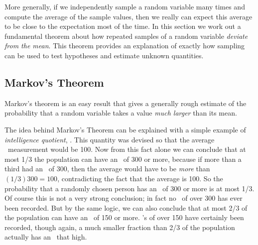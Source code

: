 More generally, if we independently sample a random variable many times
and compute the average of the sample values, then we really can expect
this average to be close to the expectation most of the time.  In this
section we work out a fundamental theorem about how repeated samples of a
random variable \emph{deviate from the mean}.  This theorem provides an
explanation of exactly how sampling can be used to test hypotheses and
estimate unknown quantities.

\subsection{Markov's Theorem}
Markov's theorem is an easy result that gives a generally rough estimate
of the probability that a random variable takes a value \emph{much larger}
than its mean.

The idea behind Markov's Theorem can be explained with a simple example of
\emph{intelligence quotient}, \IQ.  This quantity was devised so that the
average \IQ\ measurement would be 100.  Now from this fact alone we can
conclude that at most 1/3 the population can have an \IQ\ of 300 or more,
because if more than a third had an \IQ\ of 300, then the average would
have to be \emph{more} than $(1/3)300 = 100$, contradicting the fact that
the average is 100.  So the probability that a randomly chosen person has
an \IQ\ of 300 or more is at most 1/3.  Of course this is not a very
strong conclusion; in fact no \IQ\ of over 300 has ever been recorded.
But by the same logic, we can also conclude that at most 2/3 of the
population can have an \IQ\ of 150 or more.  \IQ's of over 150 have
certainly been recorded, though again, a much smaller fraction than 2/3 of
the population actually has an \IQ\ that high.

